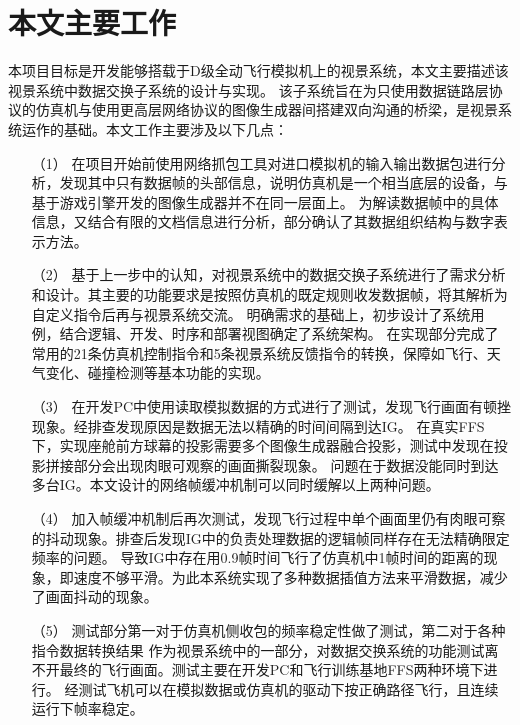 \section{本文主要工作}
本项目目标是开发能够搭载于D级全动飞行模拟机上的视景系统，本文主要描述该视景系统中数据交换子系统的设计与实现。
该子系统旨在为只使用数据链路层协议的仿真机与使用更高层网络协议的图像生成器间搭建双向沟通的桥梁，是视景系统运作的基础。本文工作主要涉及以下几点：
\begin{itemize}
    \item [（1）]
    在项目开始前使用网络抓包工具对进口模拟机的输入输出数据包进行分析，发现其中只有数据帧的头部信息，说明仿真机是一个相当底层的设备，与基于游戏引擎开发的图像生成器并不在同一层面上。
    为解读数据帧中的具体信息，又结合有限的文档信息进行分析，部分确认了其数据组织结构与数字表示方法。
    \item [（2）]
    基于上一步中的认知，对视景系统中的数据交换子系统进行了需求分析和设计。其主要的功能要求是按照仿真机的既定规则收发数据帧，将其解析为自定义指令后再与视景系统交流。
    明确需求的基础上，初步设计了系统用例，结合逻辑、开发、时序和部署视图确定了系统架构。
    在实现部分完成了常用的21条仿真机控制指令和5条视景系统反馈指令的转换，保障如飞行、天气变化、碰撞检测等基本功能的实现。
    \item [（3）]
    在开发PC中使用读取模拟数据的方式进行了测试，发现飞行画面有顿挫现象。经排查发现原因是数据无法以精确的时间间隔到达IG。
    在真实FFS下，实现座舱前方球幕的投影需要多个图像生成器融合投影，测试中发现在投影拼接部分会出现肉眼可观察的画面撕裂现象。
    问题在于数据没能同时到达多台IG。本文设计的网络帧缓冲机制可以同时缓解以上两种问题。
    \item [（4）]
    加入帧缓冲机制后再次测试，发现飞行过程中单个画面里仍有肉眼可察的抖动现象。排查后发现IG中的负责处理数据的逻辑帧同样存在无法精确限定频率的问题。
    导致IG中存在用0.9帧时间飞行了仿真机中1帧时间的距离的现象，即速度不够平滑。为此本系统实现了多种数据插值方法来平滑数据，减少了画面抖动的现象。
    \item [（5）]
    测试部分第一对于仿真机侧收包的频率稳定性做了测试，第二对于各种指令数据转换结果
    作为视景系统中的一部分，对数据交换系统的功能测试离不开最终的飞行画面。测试主要在开发PC和飞行训练基地FFS两种环境下进行。
    经测试飞机可以在模拟数据或仿真机的驱动下按正确路径飞行，且连续运行下帧率稳定。

\end{itemize}
